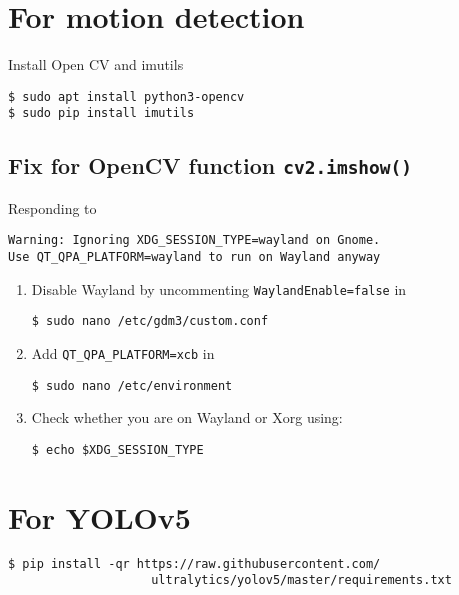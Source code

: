 \documentclass[12pt, a4paper, oneside]{article}
\begin{document}
\section{For motion detection}
Install Open CV and imutils

\begin{verbatim}
$ sudo apt install python3-opencv
$ sudo pip install imutils
\end{verbatim}


\subsection{Fix for OpenCV function \texttt{cv2.imshow()}}

Responding to
\begin{verbatim}
Warning: Ignoring XDG_SESSION_TYPE=wayland on Gnome.
Use QT_QPA_PLATFORM=wayland to run on Wayland anyway
\end{verbatim}

\begin{enumerate}

\item
Disable Wayland by uncommenting \texttt{WaylandEnable=false} in
\begin{verbatim}
$ sudo nano /etc/gdm3/custom.conf
\end{verbatim}

\item
Add \texttt{QT\_QPA\_PLATFORM=xcb} in
\begin{verbatim}
$ sudo nano /etc/environment
\end{verbatim}

\item
Check whether you are on Wayland or Xorg using:
\begin{verbatim}
$ echo $XDG_SESSION_TYPE
\end{verbatim}
\end{enumerate}


\section{For YOLOv5}

\begin{verbatim}
$ pip install -qr https://raw.githubusercontent.com/
					ultralytics/yolov5/master/requirements.txt
\end{verbatim}
\end{document}

